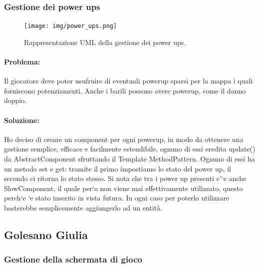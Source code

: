 \subsubsection{Gestione dei power ups}

\begin{figure}[H]
\centering{}
\texttt{[image: img/power\_ups.png]}
\caption{Rappresentazione UML della gestione dei power ups.}
\end{figure}

\paragraph{Problema:}
Il giocatore deve poter usufruire di eventuali powerup sparsi per la mappa i quali forniscono potenziamenti. Anche i barili possono avere powerup, come il danno doppio.

\paragraph{Soluzione:}
Ho deciso di creare un component per ogni powerup, in modo da ottenere una gestione semplice, efficace e facilmente estendibile, ognuno di essi eredita update() da AbstractComponent sfruttando il Template MethodPattern. Ognuno di essi ha un metodo set e get: tramite il primo impostiamo lo stato del power up, il secondo ci ritorna lo stato stesso. Si nota che tra i power up presenti c’`e anche SlowComponent, il quale per`o non viene mai effettivamente utilizzato, questo perch`e `e stato inserito in vista futura. In ogni caso per poterlo utilizzare basterebbe semplicemente aggiungerlo ad un entità.




\subsection{Golesano Giulia}

\subsubsection{Gestione della schermata di gioco}

